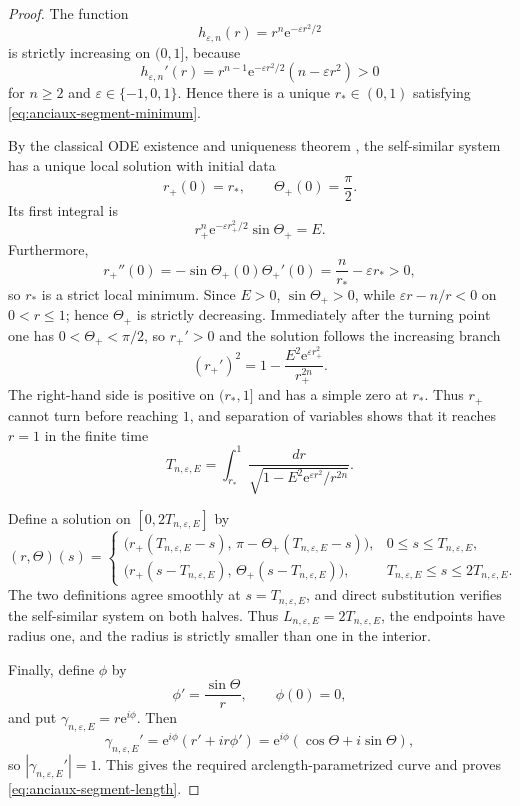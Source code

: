 \documentclass[11pt,a4paper]{article}
\numberwithin{equation}{section}
\newcommand{\ee}{\mathrm e}
\begin{document}
\begin{proof}

The function
$$
        h_{\varepsilon,n}(r)=r^n\ee^{-\varepsilon r^2/2}
$$
is strictly increasing on $(0,1]$, because
$$
        h_{\varepsilon,n}'(r)
        =r^{n-1}\ee^{-\varepsilon r^2/2}(n-\varepsilon r^2)>0
$$
for $n\ge2$ and $\varepsilon\in\{-1,0,1\}$.
Hence there is a unique $r_*\in(0,1)$ satisfying \eqref{eq:anciaux-segment-minimum}.

By the classical ODE existence and uniqueness theorem
\cite[Chapter~1]{CoddingtonLevinson1955}, the self-similar system has a unique local solution with
initial data
$$
        r_+(0)=r_*,
        \qquad
        \Theta_+(0)=\frac\pi2.
$$
Its first integral is
$$
        r_+^n\ee^{-\varepsilon r_+^2/2}\sin\Theta_+=E.
$$
Furthermore,
$$
        r_+''(0)
        =-\sin\Theta_+(0)\Theta_+'(0)
        =\frac n{r_*}-\varepsilon r_*>0,
$$
so $r_*$ is a strict local minimum.  Since $E>0$,
$\sin\Theta_+>0$, while
$\varepsilon r-n/r<0$ on $0<r\le1$; hence $\Theta_+$ is strictly decreasing.
Immediately after the turning point one has $0<\Theta_+<\pi/2$, so
$r_+'>0$ and the solution follows the increasing branch
\begin{equation}
        (r_+')^2
        =1-\frac{E^2\ee^{\varepsilon r_+^2}}{r_+^{2n}}.
\end{equation}
The right-hand side is positive on $(r_*,1]$ and has a simple zero at $r_*$.
Thus $r_+$ cannot turn before reaching $1$, and separation of variables shows
that it reaches $r=1$ in the finite time
$$
        T_{n,\varepsilon,E}=\int_{r_*}^{1}
        \frac{dr}{\sqrt{1-E^2\ee^{\varepsilon r^2}/r^{2n}}}.
$$

Define a solution on $[0,2T_{n,\varepsilon,E}]$ by
$$
(r,\Theta)(s)=
\begin{cases}
\bigl(r_+(T_{n,\varepsilon,E}-s),\,\pi-\Theta_+(T_{n,\varepsilon,E}-s)\bigr),&0\le s\le T_{n,\varepsilon,E},\\
\bigl(r_+(s-T_{n,\varepsilon,E}),\,\Theta_+(s-T_{n,\varepsilon,E})\bigr),&T_{n,\varepsilon,E}\le s\le2T_{n,\varepsilon,E}.
\end{cases}
$$
The two definitions agree smoothly at $s=T_{n,\varepsilon,E}$, and direct substitution verifies the self-similar system on both halves.  Thus $L_{n,\varepsilon,E}=2T_{n,\varepsilon,E}$, the endpoints have radius one, and the radius is strictly smaller than one in the interior.

Finally, define $\phi$ by
$$
        \phi'=\frac{\sin\Theta}{r},
        \qquad
        \phi(0)=0,
$$
and put $\gamma_{n,\varepsilon,E}=r\ee^{i\phi}$.  Then
$$
        \gamma_{n,\varepsilon,E}'
        =\ee^{i\phi}(r'+ir\phi')
        =\ee^{i\phi}(\cos\Theta+i\sin\Theta),
$$
so $|\gamma_{n,\varepsilon,E}'|=1$.  This gives the required arclength-parametrized curve and proves \eqref{eq:anciaux-segment-length}.
\end{proof}
\end{document}
